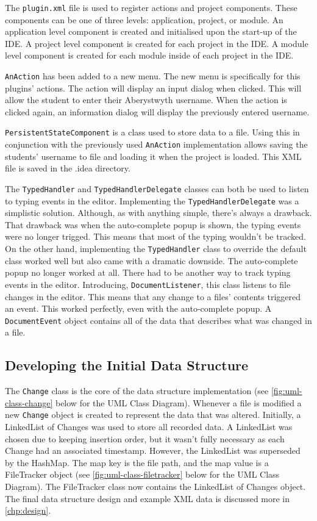 The \texttt{plugin.xml} file is used to register actions and project components. These components can be one of three levels: application, project, or module\cite{IntelliJProjectComponents}. An application level component is created and initialised upon the start-up of the IDE. A project level component is created for each project in the IDE. A module level component is created for each module inside of each project in the IDE.

\texttt{AnAction} has been added to a new menu. The new menu is specifically for this plugins' actions. The action will display an input dialog when clicked. This will allow the student to enter their Aberystwyth username. When the action is clicked again, an information dialog will display the previously entered username.

\texttt{PersistentStateComponent} is a class used to store data to a file. Using this in conjunction with the previously used \texttt{AnAction} implementation allows saving the students' username to file and loading it when the project is loaded. This XML file is saved in the .idea directory.

The \texttt{TypedHandler} and \texttt{TypedHandlerDelegate} classes can both be used to listen to typing events in the editor. Implementing the \texttt{TypedHandlerDelegate} was a simplistic solution. Although, as with anything simple, there's always a drawback. That drawback was when the auto-complete popup is shown, the typing events were no longer trigged. This means that most of the typing wouldn't be tracked. On the other hand, implementing the \texttt{TypedHandler} class to override the default class worked well but also came with a dramatic downside. The auto-complete popup no longer worked at all. There had to be another way to track typing events in the editor. Introducing, \texttt{DocumentListener}, this class listens to file changes in the editor. This means that any change to a files' contents triggered an event. This worked perfectly, even with the auto-complete popup. A \texttt{DocumentEvent} object contains all of the data that describes what was changed in a file.

\subsection{Developing the Initial Data Structure}
The \texttt{Change} class is the core of the data structure implementation (see \autoref{fig:uml-class-change} below for the UML Class Diagram). Whenever a file is modified a new \texttt{Change} object is created to represent the data that was altered. Initially, a LinkedList of Changes was used to store all recorded data. A LinkedList was chosen due to keeping insertion order, but it wasn't fully necessary as each Change had an associated timestamp. However, the LinkedList was superseded by the HashMap. The map key is the file path, and the map value is a FileTracker object (see \autoref{fig:uml-class-filetracker} below for the UML Class Diagram). The FileTracker class now contains the LinkedList of Changes object. The final data structure design and example XML data is discussed more in \autoref{chp:design}.

